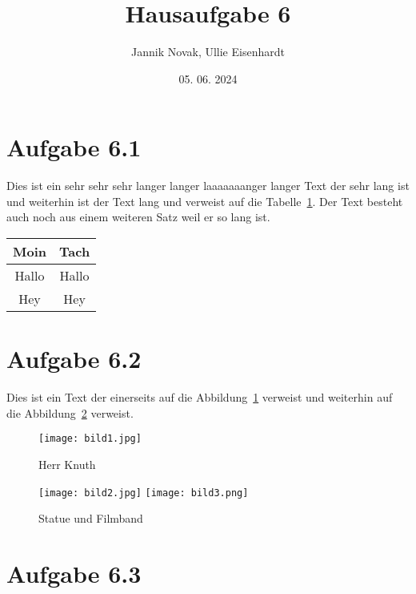 \documentclass{scrartcl}
\title{Hausaufgabe 6}
\author{Jannik Novak, Ullie Eisenhardt}
\date{05. 06. 2024}
\begin{document}
\maketitle

\clearpage

\tableofcontents

\clearpage

\section{Aufgabe 6.1}

Dies ist ein sehr sehr sehr langer langer laaaaaaanger langer Text der sehr lang ist und weiterhin ist der Text lang und verweist auf die Tabelle~\ref{tab:table1}. Der Text besteht auch noch aus einem weiteren Satz weil er so lang ist.\\

%
\begin{table}[h]
    \centering
    \label{tab:table1}
    \begin{tabular}{c|c}
         Moin & Tach \\
         \hline
         Hallo & Hallo  \\
         Hey & Hey 
    \end{tabular}
\end{table}
%

\section{Aufgabe 6.2}

Dies ist ein Text der einerseits auf die Abbildung~\ref{fig:bild1} verweist und weiterhin auf die Abbildung~\ref{fig:bild23} verweist.

%
\begin{figure}[h]
    \centering
    \texttt{[image: bild1.jpg]}
    \caption{Herr Knuth}
    \label{fig:bild1}
\end{figure}
%

%
\begin{figure}[h]
    \centering
    \texttt{[image: bild2.jpg]}
    \texttt{[image: bild3.png]}
    \caption{Statue und Filmband}
    \label{fig:bild23}
\end{figure}
%

\section{Aufgabe 6.3}
\end{document}
